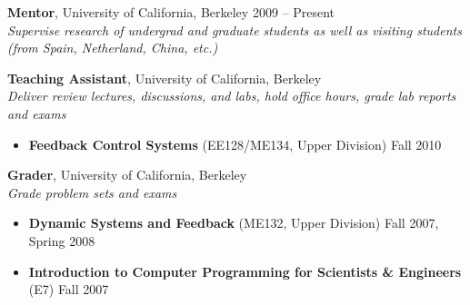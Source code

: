 \documentclass{res}
\begin{document}
\begin{resume}
    \textbf{Mentor}, University of California, Berkeley \hfill{2009 -- Present} \\
    \emph{Supervise research of undergrad and graduate students as well as visiting students (from Spain, Netherland, China, etc.)}

    \textbf{Teaching Assistant}, University of California, Berkeley\\
    \emph{Deliver review lectures, discussions, and labs, hold office hours, grade lab reports and exams}
    \begin{itemize}
    \item\textbf{Feedback Control Systems} (EE128/ME134, Upper Division) \hfill{Fall 2010}
    \end{itemize}

    \textbf{Grader}, University of California, Berkeley\\
    \emph{Grade problem sets and exams}
    \begin{itemize}
    \item\textbf{Dynamic Systems and Feedback} (ME132, Upper Division) \hfill{Fall 2007, Spring 2008}
    \item\textbf{Introduction to Computer Programming for Scientists \& Engineers} (E7)  \hfill{Fall 2007}
    \end{itemize}


\end{resume}
\end{document}
